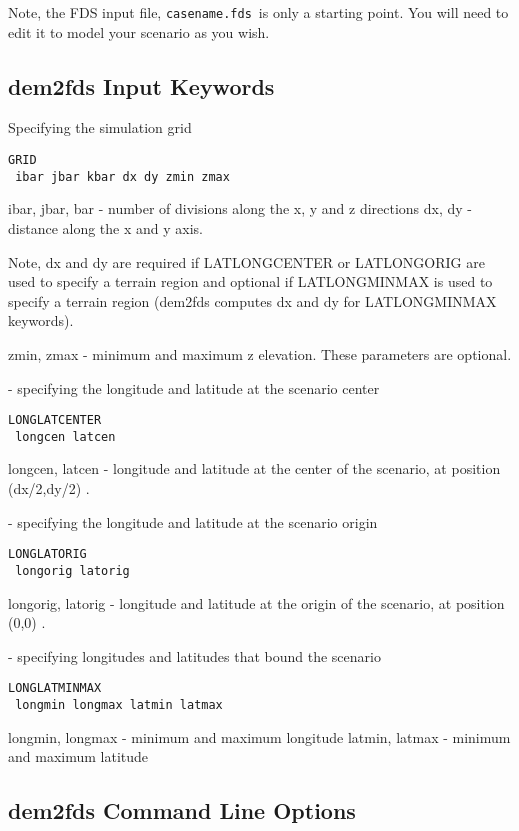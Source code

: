 Note, the FDS input file, {\tt casename.fds}\ is only a starting point.  You will need to
edit it to model your scenario as you wish.

\subsection{dem2fds Input Keywords}

\blist
{} Specifying the simulation grid
\begin{verbatim}
GRID
 ibar jbar kbar dx dy zmin zmax
\end{verbatim}

ibar, jbar, bar - number of divisions along the x, y and z directions
dx, dy - distance along the x and y axis.

Note, dx and dy are required if LATLONGCENTER or
LATLONGORIG are used to specify a terrain region and
optional if LATLONGMINMAX is used to specify a terrain region (dem2fds computes
dx and dy for LATLONGMINMAX keywords).

zmin, zmax - minimum and maximum z elevation.  These parameters are optional.


 - specifying the longitude and latitude at the scenario center

\begin{verbatim}
LONGLATCENTER
 longcen latcen
\end{verbatim}


longcen, latcen - longitude and latitude at the center of the scenario, at
position (dx/2,dy/2) .

- specifying the longitude and latitude at the scenario origin
\begin{verbatim}
LONGLATORIG
 longorig latorig
\end{verbatim}


longorig, latorig - longitude and latitude at the origin of the scenario, at
position (0,0) .

 - specifying longitudes and latitudes that bound the scenario
\begin{verbatim}
LONGLATMINMAX
 longmin longmax latmin latmax
\end{verbatim}


longmin, longmax - minimum and maximum longitude
latmin, latmax - minimum and maximum latitude

\elist

\subsection{dem2fds Command Line Options}

